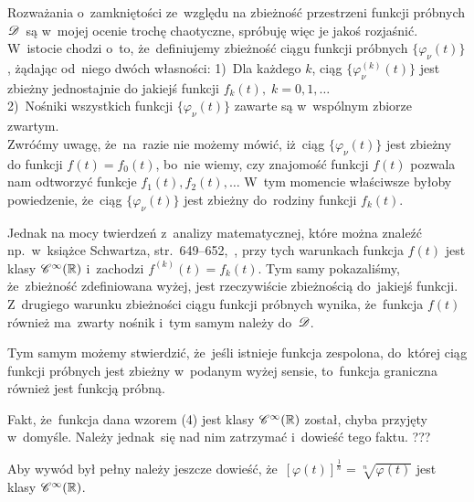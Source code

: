 \documentclass[a4paper,11pt]{article}
\numberwithin{equation}{section}
\begin{document}
\noindent
{} Rozważania o~zamkniętości ze~względu na zbieżność
przestrzeni funkcji próbnych $\mathcal{D}$~są w~mojej ocenie trochę
chaotyczne, spróbuję więc je jakoś rozjaśnić. W~istocie chodzi o~to,
że~definiujemy zbieżność ciągu funkcji próbnych
$\{ \varphi_{ \nu }( t ) \}$, żądając od~niego dwóch własności:
1)~Dla każdego $k$, ciąg $\{ \varphi_{ \nu }^{ ( k ) }( t ) \}$ jest
zbieżny jednostajnie do jakiejś funkcji
$f_{ k }( t ), \; k = 0, 1, \ldots$ \\
2)~Nośniki wszystkich funkcji $\{ \varphi_{ \nu }( t ) \}$ zawarte są
w~wspólnym zbiorze zwartym. \\
Zwróćmy uwagę, że~na~razie nie możemy mówić, iż~ciąg
$\{ \varphi_{ \nu }( t ) \}$ jest zbieżny do funkcji
$f( t ) = f_{ 0 }( t )$, bo~nie wiemy, czy znajomość funkcji $f( t )$
pozwala nam odtworzyć funkcje $f_{ 1 }( t ), f_{ 2 }( t ), \ldots$ W~tym
momencie właściwsze byłoby powiedzenie, że~ciąg
$\{ \varphi_{ \nu }( t ) \}$ jest zbieżny do~rodziny funkcji
$f_{ k }( t )$.

Jednak na mocy twierdzeń z~analizy matematycznej, które można znaleźć
np.~w~książce Schwartza, str.~649--652,~\cite{SchwartzKursAnalizyMatematycznejVolI1979}, przy tych
warunkach funkcja $f( t )$ jest klasy $\mathcal{C}^{ \infty }( \mathbb{R} )$ i~zachodzi
$f^{ ( k ) }( t ) = f_{ k }( t )$. Tym samy pokazaliśmy, że~zbieżność
zdefiniowana wyżej, jest rzeczywiście zbieżnością do~jakiejś funkcji.
Z~drugiego warunku zbieżności ciągu funkcji próbnych wynika,
że~funkcja $f( t )$ również ma~zwarty nośnik i~tym samym należy
do~$\mathcal{D}$.

Tym samym możemy stwierdzić, że~jeśli istnieje funkcja zespolona,
do~której ciąg funkcji próbnych jest zbieżny w~podanym wyżej sensie,
to~funkcja graniczna również jest funkcją próbną.

\VerSpaceFour





\noindent
{} Fakt, że~funkcja dana wzorem (4) jest klasy
$\mathcal{C}^{ \infty }( \mathbb{R} )$ został, chyba przyjęty w~domyśle. Należy jednak~się
nad nim zatrzymać i~dowieść tego faktu. ???

\VerSpaceFour





\noindent
{} Aby wywód był pełny należy jeszcze dowieść,
że~$[ \varphi( t ) ]^{ \frac{ 1 }{ n } } = \sqrt[ n ]{ \varphi( t ) }$ jest
klasy $\mathcal{C}^{ \infty }( \mathbb{R} )$.

\VerSpaceFour
\end{document}
